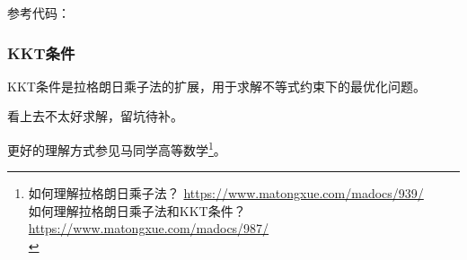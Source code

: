 参考代码：


\subsubsection{KKT条件}
KKT条件是拉格朗日乘子法的扩展，用于求解不等式约束下的最优化问题。

看上去不太好求解，留坑待补。

更好的理解方式参见马同学高等数学\footnote{
    如何理解拉格朗日乘子法？
	\url{https://www.matongxue.com/madocs/939/}\\
	如何理解拉格朗日乘子法和KKT条件？
	\url{https://www.matongxue.com/madocs/987/}\\
}。
